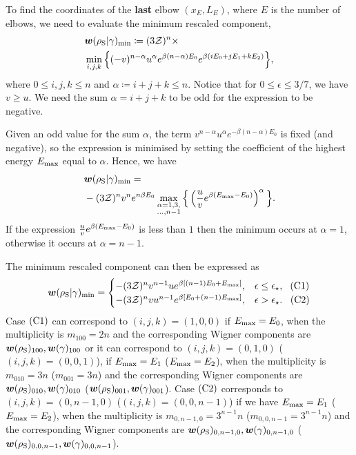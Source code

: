 \documentclass[pra,
aps,
twocolumn,
superscriptaddress,
groupedaddress,
nofootinbib,
reprint
]{revtex4-1}
\begin{document}

To find the coordinates of the \textbf{last} elbow $(x_E, L_E)$, where $E$ is the number of elbows, we need to evaluate the minimum rescaled component,
\begin{align}
	&\bm{w}(\rho_{\rm{S}} | \gamma)_{\rm{min}} \coloneqq (3\mathcal{Z})^{n}\times \nonumber\\
	&\min\limits_{i,j,k}\Big\{ (-v)^{n-\alpha} u^{\alpha} e^{\beta (n-\alpha)E_0} e^{\beta ( i E_0 + j E_1 + k E_2 )} \Big\}, \label{eq:min_slope}
\end{align}
where $0 \leq i,j,k \leq n$ and $\alpha \coloneqq i+j+k \leq n$.
Notice that for $0 \leq \epsilon \leq 3/7$, we have $v \geq u$. 
We need the sum $\alpha = i+j+k$ to be odd for the expression to be negative.

Given an odd value for the sum $\alpha$, the term $v^{n-\alpha} u^{\alpha} e^{-\beta (n-\alpha)E_0}$ is fixed (and negative), so the expression is minimised by setting the coefficient of the highest energy $E_{\rm{max}}$ equal to $\alpha$.
Hence, we have
\begin{align}
	&\bm{w}(\rho_{\rm{S}} | \gamma)_{\rm{min}} = \nonumber\\
	&-(3\mathcal{Z})^{n} v^n e^{n\beta E_0}\max\limits_{\substack{\alpha = 1,3, \\ \dots,n-1}}{\Big\{ \left( \frac{u}{v} e^{\beta (E_{\rm{max}} - E_0)} \right)^{\alpha} \Big\}}.
\end{align}
If the expression $\frac{u}{v} e^{\beta (E_{\rm{max}} - E_0)}$ is less than $1$ then the minimum occurs at $\alpha=1$, otherwise it occurs at $\alpha = n-1$.

The minimum rescaled component can then be expressed as
\begin{equation}
\bm{w}(\rho_{\rm{S}} | \gamma)_{\rm{min}} =
	\begin{cases}
		-(3\mathcal{Z})^{n} v^{n-1} u e^{\beta [(n-1)E_0 + E_{\rm{max}}]}, &\epsilon \leq \epsilon_{\star},\ \hspace{3pt}\rm{(C1)}	\\
		-(3\mathcal{Z})^{n} v u^{n-1} e^{\beta [E_0 + (n-1)E_{\rm{max}}]}, &\epsilon > \epsilon_{\star}.\ \hspace{5pt}\rm{(C2)} 
	\end{cases}
\end{equation}
Case $\rm{(C1)}$ can correspond to $(i,j,k) = (1,0,0)$ if $E_{\rm{max}} = E_0$, when the multiplicity is $m_{100} = 2n$ and the corresponding Wigner components are $\bm{w}(\rho_{\rm{S}})_{100}, \bm{w}(\gamma)_{100}$ or it can correspond to $(i,j,k) = (0,1,0)$ ($(i,j,k) = (0,0,1)$), if $E_{\rm{max}} = E_1$ ($E_{\rm{max}} = E_2$), when the multiplicity is $m_{010} = 3n$ ($m_{001} = 3n$) and the corresponding Wigner components are $\bm{w}(\rho_{\rm{S}})_{010}, \bm{w}(\gamma)_{010}$ ($\bm{w}(\rho_{\rm{S}})_{001}, \bm{w}(\gamma)_{001}$).
Case $\rm{(C2)}$ corresponds to $(i,j,k) = (0,n-1,0)$ ($(i,j,k) = (0,0,n-1)$)
if we have $E_{\rm{max}} = E_1$ ($E_{\rm{max}} = E_2$), when the multiplicity is $m_{0,n-1,0} = 3^{n-1}n$ ($m_{0,0,n-1} = 3^{n-1}n$) and the corresponding Wigner components are $\bm{w}(\rho_{\rm{S}})_{0,n-1,0}, \bm{w}(\gamma)_{0,n-1,0}$ ($\bm{w}(\rho_{\rm{S}})_{0,0,n-1}, \bm{w}(\gamma)_{0,0,n-1}$).
\end{document}
